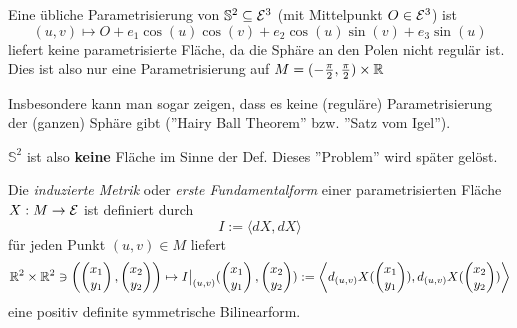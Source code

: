 \begin{example}
	
	Eine übliche Parametrisierung von $ \mathbb{S}^2 \subseteq \mathcal E^3 $ (mit Mittelpunkt $O \in \mathcal E^3$) ist  
	\[ (u,v) \mapsto O + e_1\cos(u)\cos(v) + e_2\cos(u)\sin(v)+e_3\sin(u) \]
	liefert keine parametrisierte Fläche, da die Sphäre an den Polen nicht regulär ist.
	Dies ist also nur eine Parametrisierung auf $ M = (-\frac{\pi}{2},\frac{\pi}{2}) \times \mathbb R $
	
	Insbesondere kann man sogar zeigen, dass es keine (reguläre) Parametrisierung der (ganzen) Sphäre gibt (''Hairy Ball Theorem'' bzw. ''Satz vom Igel'').
	
	$ \mathbb{S}^2 $ ist also \textbf{keine} Fläche im Sinne der Def. Dieses ''Problem'' wird später gelöst.
\end{example}

\begin{lemma, definition}
	
	Die \emph{induzierte Metrik} oder \emph{erste Fundamentalform} einer parametrisierten Fläche $ X: M \rightarrow \mathcal E$ ist definiert durch
	\[ I := \langle dX,dX \rangle \]
	für jeden Punkt $ (u,v) \in M $ liefert 
	\[ \mathbb R^2 \times \mathbb R^2 \ni \left( \begin{pmatrix} x_1\\y_1 \end{pmatrix}, \begin{pmatrix} x_2\\y_2 \end{pmatrix} \right)  \mapsto I \big|_{(u,v)}(\begin{pmatrix}
	x_1 \\
	y_1
	\end{pmatrix},\begin{pmatrix}
	x_2 \\
	y_2
	\end{pmatrix}) := \left\langle d_{(u,v)}X(\begin{pmatrix}
	x_1 \\
	y_1
	\end{pmatrix}),  d_{(u,v)}X(\begin{pmatrix}
	x_2 \\
	y_2
	\end{pmatrix})  \right\rangle \]
	eine positiv definite symmetrische Bilinearform.
\end{lemma, definition}

